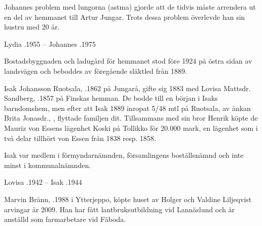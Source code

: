 Johannes problem med lungorna (astma) gjorde att de tidvis måste arrendera ut en del av hemmanet till Artur Jungar. Trots dessa problem överlevde han sin hustru med 20 år.
\begin{jhchildren}
  \item {}
  \item {}
\end{jhchildren}
Lydia .1955  --  Johannes .1975



Bostadsbyggnaden och ladugård för hemmanet stod före 1924 på östra sidan av landsvägen och beboddes av föregående släktled från 1889.


Isak Johansson Ruotsala, .1862 på Jungarå,  gifte sig 1883 med Lovisa Mattsdr. Sandberg, .1857 på Finskas hemman. De bodde till en början i Isaks barndomshem, men efter att Isak 1889 inropat 5/48 mtl på Ruotsala, av änkan Brita Jonasdr., , flyttade familjen dit. Tillsammans med sin bror Henrik köpte de Mauriz von Essens lägenhet Koski på Tollikko för 20.000 mark, en lägenhet som i två delar tillhört von Essen från 1838 resp. 1858.

Isak var medlem i förmyndarnämnden, församlingens boställsnämnd och inte minst i kommunalnämnden.
\begin{jhchildren}
  \item {}
  \item {}
  \item {}
  \item {}
  \item {}
  \item {}
  \item {}
\end{jhchildren}
Lovisa .1942  --  Isak .1944




Marvin Bränn, .1988 i Ytterjeppo, köpte huset av Holger och Valdine Liljeqvist arvingar år 2009. Han har fått lantbruksutbildning vid Lannäslund och är anställd som farmarbetare vid Fäboda.

